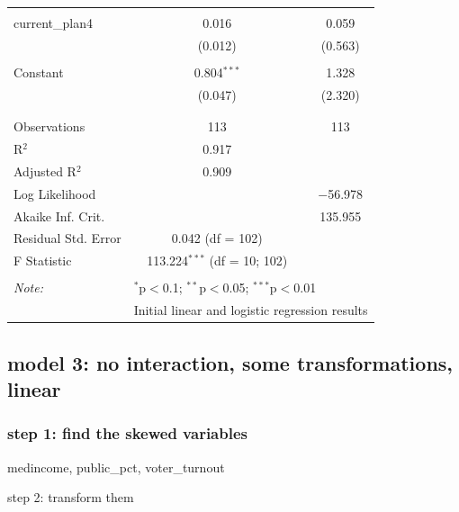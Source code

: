 \documentclass[
]{article}
\newenvironment{Shaded}{\begin{snugshade}}{\end{snugshade}}
\newcommand{\DataTypeTok}[1]{\textcolor[rgb]{0.13,0.29,0.53}{#1}}
\newcommand{\FloatTok}[1]{\textcolor[rgb]{0.00,0.00,0.81}{#1}}
\newcommand{\KeywordTok}[1]{\textcolor[rgb]{0.13,0.29,0.53}{\textbf{#1}}}
\newcommand{\NormalTok}[1]{#1}
\newcommand{\OperatorTok}[1]{\textcolor[rgb]{0.81,0.36,0.00}{\textbf{#1}}}
\newcommand{\StringTok}[1]{\textcolor[rgb]{0.31,0.60,0.02}{#1}}
\begin{document}
\begin{table}[!htbp]
\begin{tabular}{@{\extracolsep{5pt}}lcc}
  & & \\ 
 current\_plan4 & 0.016 & 0.059 \\ 
  & (0.012) & (0.563) \\ 
  & & \\ 
 Constant & 0.804$^{***}$ & 1.328 \\ 
  & (0.047) & (2.320) \\ 
  & & \\ 
\hline \\[-1.8ex] 
Observations & 113 & 113 \\ 
R$^{2}$ & 0.917 &  \\ 
Adjusted R$^{2}$ & 0.909 &  \\ 
Log Likelihood &  & $-$56.978 \\ 
Akaike Inf. Crit. &  & 135.955 \\ 
Residual Std. Error & 0.042 (df = 102) &  \\ 
F Statistic & 113.224$^{***}$ (df = 10; 102) &  \\ 
\hline 
\hline \\[-1.8ex] 
\textit{Note:}  & \multicolumn{2}{l}{$^{*}$p$<$0.1; $^{**}$p$<$0.05; $^{***}$p$<$0.01} \\ 
 & \multicolumn{2}{l}{Initial linear and logistic regression results} \\ 
\end{tabular} 
\end{table}

\hypertarget{model-3-no-interaction-some-transformations-linear}{%
\subsection{model 3: no interaction, some transformations,
linear}\label{model-3-no-interaction-some-transformations-linear}}

\hypertarget{step-1-find-the-skewed-variables}{%
\subsubsection{step 1: find the skewed
variables}\label{step-1-find-the-skewed-variables}}

medincome, public\_pct, voter\_turnout

step 2: transform them

\begin{Shaded}
\end{Shaded}
\end{document}
